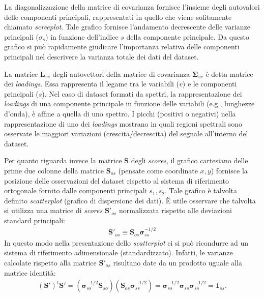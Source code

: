 \documentclass[11pt]{amsart}
\begin{document}
La diagonalizzazione della matrice di covarianza fornisce l'insieme degli autovalori delle componenti principali, rappresentati in quello che viene solitamente chiamato {\it screeplot}. Tale grafico fornisce l'andamento decrescente delle varianze principali ($\sigma_s$) in funzione dell'indice $s$ della componente principale. Da questo grafico si può rapidamente giudicare l'importanza relativa delle componenti principali nel descrivere la varianza totale dei dati del dataset. 

La matrice $\bm L_{vs}$ degli autovettori della matrice di covarianza $\bm \Sigma_{vv}$ è detta matrice dei {\em loadings}. Essa rappresenta il legame tra le variabili ($v$) e le componenti principali ($s$). Nel caso di dataset formati da spettri, la rappresentazione dei {\em loadings} di una componente principale in funzione delle variabili (e.g., lunghezze d'onda), è affine a quella di uno spettro. I picchi (positivi o negativi) nella rappresentazione di uno dei {\em loadings} mostrano in quali regioni spettrali sono osservate le maggiori variazioni (crescita/decrescita) del segnale all'interno del dataset.

Per quanto riguarda invece la matrice $\bm S$ degli {\em scores}, il grafico cartesiano delle prime due colonne della matrice $\bm S_{os}$ (pensate come coordinate $x,y$) fornisce la posizione delle osservazioni del dataset rispetto al sistema di riferimento ortogonale fornito dalle componenti principali $s_1, s_2$. Tale grafico è talvolta definito {\em scatterplot} (grafico di dispersione dei dati).
È utile osservare che talvolta si utilizza una matrice di {\em scores} $\bm S'_{os}$ normalizzata rispetto alle deviazioni standard principali:
%
\begin{eqnarray}
\bm S'_{os} \equiv \bm S_{os} \bm \sigma_{ss}^{-1/2}
\end{eqnarray}
%
In questo modo nella presentazione dello {\em scatterplot} ci si può ricondurre ad un sistema di riferimento adimensionale (standardizzato). Infatti, le varianze calcolate rispetto alla matrice $\bm S'_{os}$ risultano date da un prodotto uguale alla matrice identità:
%
\begin{eqnarray}
(\bm S')^t \bm S' = 
%
\left( \bm \sigma_{ss}^{-1/2} \bm S_{so} \right) \left( \bm S_{os} \bm \sigma_{ss}^{-1/2} \right) =
%
\bm \sigma_{ss}^{-1/2} \bm \sigma_{ss} \bm \sigma_{ss}^{-1/2} = {\bm 1}_{ss}.
\end{eqnarray}
\end{document}
